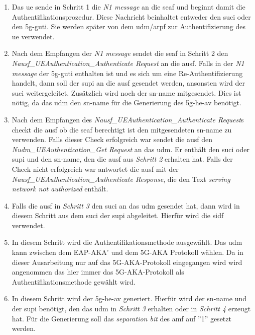 \begin{enumerate}
\item Das \gls{ue} sende in Schritt 1 die \textit{N1 message} an die \gls{seaf} und beginnt damit die Authentifikationsprozedur.
Diese Nachricht beinhaltet entweder den \gls{suci} oder den \gls{5g-guti}.
Sie werden später von dem \gls{udm}/\gls{arpf} zur Authentifizierung des \gls{ue} verwendet.

\item Nach dem Empfangen der \textit{N1 message} sendet die \gls{seaf} in Schritt 2 den \textit{Nausf\_UEAuthentication\_Authenticate Request} an die \gls{ausf}.
Falls in der \textit{N1 message} der \gls{5g-guti} enthalten ist und es sich um eine Re-Authentifizierung handelt, dann soll der \gls{supi} an die \gls{ausf} gesendet werden, ansonsten wird der \gls{suci} weitergeleitet.
Zusätzlich wird noch der \gls{sn-name} mitgesendet.
Dies ist nötig, da das \gls{udm} den \gls{sn-name} für die Generierung des \gls{5g-he-av} benötigt.

\item Nach dem Empfangen des \textit{Nausf\_UEAuthentication\_Authenticate Request}s checkt die \gls{ausf} ob die \gls{seaf} berechtigt ist den mitgesendeten \gls{sn-name} zu verwenden.
Falls dieser Check erfolgreich war sendet die \gls{ausf} den \textit{Nudm\_UEAuthentication\_Get Request} an das \gls{udm}.
Er enthält den \gls{suci} oder \gls{supi} und den \gls{sn-name}, den die \gls{ausf} aus \textit{Schritt 2} erhalten hat.
Falls der Check nicht erfolgreich war antwortet die \gls{ausf} mit der \textit{Nausf\_UEAuthentication\_Authenticate Response}, die den Text \textit{serving network not authorized} enthält.

\item Falls die \gls{ausf} in \textit{Schritt 3} den \gls{suci} an das \gls{udm} gesendet hat, dann wird in diesem Schritt aus dem \gls{suci} der \gls{supi} abgeleitet.
Hierfür wird die \gls{sidf} verwendet.

\item In diesem Schritt wird die Authentifikationsmethode ausgewählt.
Das \gls{udm} kann zwischen dem EAP-AKA' und dem 5G-AKA Protokoll wählen.
Da in dieser Ausarbeitung nur auf das 5G-AKA-Protokoll eingegangen wird wird angenommen das hier immer das 5G-AKA-Protokoll als Authentifikationsmethode gewählt wird.

\item In diesem Schritt wird der \gls{5g-he-av} generiert.
Hierfür wird der \gls{sn-name} und der \gls{supi} benötigt, den das \gls{udm} in \textit{Schritt 3} erhalten oder in \textit{Schritt 4} erzeugt hat.
Für die Generierung soll das \textit{separation bit} des \gls{amf} auf ''1'' gesetzt werden.


\end{enumerate}
